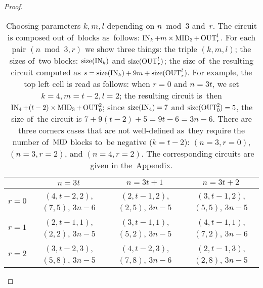 \begin{proof}
\begin{table}[!ht]
\begin{center}
\begin{tabular}{cccc}
\toprule
& $n=3t$ & $n=3t+1$ & $n=3t+2$\\
\midrule
$r=0$
& $(4, t-2, 2)$, $(7, 5)$, $3n-6$
& $(2, t-1, 2)$, $(2, 5)$, $3n-5$
& $(3, t-1, 2)$, $(5, 5)$, $3n-5$
\\
$r=1$
& $(2, t-1, 1)$, $(2, 2)$, $3n-5$
& $(3, t-1, 1)$, $(5, 2)$, $3n-5$
& $(4, t-1, 1)$, $(7, 2)$, $3n-6$
\\
$r=2$
& $(3, t-2, 3)$, $(5, 8)$, $3n-5$
& $(4, t-2, 3)$, $(7, 8)$, $3n-6$
& $(2, t-1, 3)$, $(2, 8)$, $3n-5$
\\
\bottomrule
\end{tabular}
\end{center}
\caption{Choosing parameters $k, m, l$ depending on $n \bmod 3$ and~$r$. The circuit is composed out of~blocks
as~follows: $\operatorname{IN}_k + m \times \operatorname{MID}_3 + \operatorname{OUT}_r^l$. For each
pair $(n \bmod 3, r)$ we show three things: the triple
$(k, m, l)$; the sizes of~two blocks: $\operatorname{size}(\operatorname{IN}_k)$ and $\operatorname{size}(\operatorname{OUT}_r^l)$; the size of~the resulting circuit
computed as $s=\operatorname{size}(\operatorname{IN}_k)+9m+\operatorname{size}(\operatorname{OUT}_r^l)$. For example, the top left cell is read as follows: when $r=0$ and $n=3t$, we set $k=4,m=t-2,l=2$; the resulting circuit
is~then $\operatorname{IN}_4 + (t-2) \times \operatorname{MID}_3 + \operatorname{OUT}_0^2$; since $\operatorname{size}(\operatorname{IN}_4)=7$ and $\operatorname{size}(\operatorname{OUT}_0^2)=5$, the size of~the circuit is $7+9(t-2)+5=9t-6=3n-6$.
There are three corners cases that are not well-defined as~they require the
number of~$\operatorname{MID}$ blocks to~be negative ($k=t-2$): $(n=3,r=0)$, $(n=3,r=2)$, and $(n=4, r=2)$. The corresponding circuits are
given in the~Appendix.}
\label{table:parameters}
\end{table}
\end{proof}


